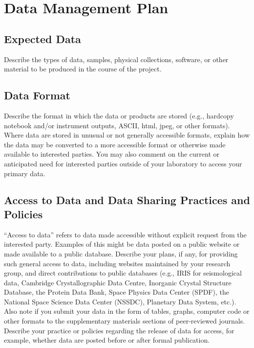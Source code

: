 \documentclass[11pt]{article}
\begin{document}

\section*{Data Management Plan}

\subsection{Expected Data}

Describe the types of data, samples, physical collections, software, or other material to be produced in the course of the project.

\subsection{Data Format}

Describe the format in which the data or products are stored (e.g., hardcopy notebook and/or instrument outputs, ASCII, html, jpeg, or other formats). Where data are stored in unusual or not generally accessible formats, explain how the data may be converted to a more accessible format or otherwise made available to interested parties.  You may also comment on the current or anticipated need for interested parties outside of your laboratory to access your primary data.

\subsection{Access to Data and Data Sharing Practices and Policies}

“Access to data” refers to data made accessible without explicit request from the interested party. Examples of this might be data posted on a public website or made available to a public database. Describe your plans, if any, for providing such general access to data, including websites maintained by your research group, and direct contributions to public databases (e.g., IRIS for seismological data, Cambridge Crystallographic Data Centre, Inorganic Crystal Structure Database, the Protein Data Bank, Space Physics Data Center (SPDF), the National Space Science Data Center (NSSDC), Planetary Data System, etc.). Also note if you submit your data in the form of tables, graphs, computer code or other formats to the supplementary materials sections of peer-reviewed journals. Describe your practice or policies regarding the release of data for access, for example, whether data are posted before or after formal publication.
\end{document}

